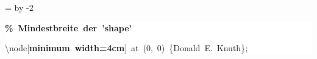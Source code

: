 \begingroup
\ttfamily
{}
=\textwidth
\advance{} by -2\fboxsep
\noindent
\colorbox{background}
{%
\parbox{\dimen255}
{%
\rule[-0.5ex]{0pt}{2.5ex}\hspace*{0.0em}\textcolor{G}{\textbf{\%~Mindestbreite~der~'shape'}}\\
\rule[-0.5ex]{0pt}{2.5ex}\hspace*{0.0em}\textbackslash{}node[\textcolor{R}{\textbf{minimum~width=4cm}}]~at~(0,~0)~\{Donald~E.~Knuth\};}%
}%
\endgroup

